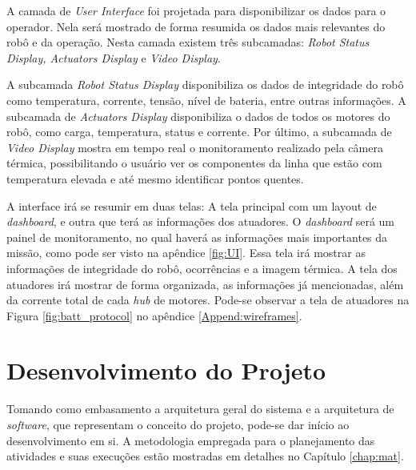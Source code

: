 A camada de \textit{User Interface} foi projetada para disponibilizar os dados para o operador. Nela será mostrado de forma resumida os dados mais relevantes do robô e da operação. Nesta camada existem três subcamadas: \textit{Robot Status Display, Actuators Display} e \textit{Video Display}. 

A subcamada \textit{Robot Status Display} disponibiliza os dados de integridade do robô como temperatura, corrente, tensão, nível de bateria, entre outras informações. A subcamada de \textit{Actuators Display} disponibiliza o dados de todos os motores do robô, como carga, temperatura, status e corrente. Por último, a subcamada de \textit{Video Display} mostra em tempo real o monitoramento realizado pela câmera térmica, possibilitando o usuário ver os componentes da linha que estão com temperatura elevada e até mesmo identificar pontos quentes.

A interface irá se resumir em duas telas: A tela principal com um layout de \textit{dashboard}, e outra que terá as informações dos atuadores. O \textit{dashboard} será um painel de monitoramento, no qual haverá as informações mais importantes da missão, como pode ser visto na apêndice \ref{fig:UI}. Essa tela irá mostrar as informações de integridade do robô, ocorrências e a imagem térmica. A tela dos atuadores irá mostrar de forma organizada, as informações já mencionadas, além da corrente total de cada \textit{hub} de motores. Pode-se observar a tela de atuadores na Figura \ref{fig:batt_protocol} no apêndice \ref{Append:wireframes}.

\section{Desenvolvimento do Projeto}

Tomando como embasamento a arquitetura geral do sistema e a arquitetura de \textit{software}, que representam o conceito do projeto, pode-se dar início ao desenvolvimento em si. A metodologia empregada para o planejamento das atividades e suas execuções estão mostradas em detalhes no Capítulo \ref{chap:mat}.





